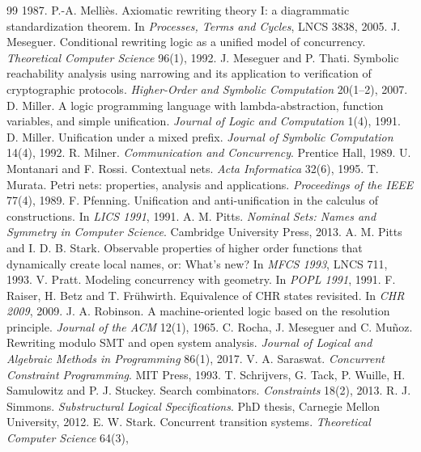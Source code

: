 \documentclass[11pt]{article}
\theoremstyle{remark}
\begin{document}
\begin{thebibliography}{99}
  1987.
 P.-A. Melli\`es. Axiomatic rewriting theory I: a diagrammatic standardization theorem.
  In \emph{Processes, Terms and Cycles}, LNCS 3838, 2005.
 J. Meseguer. Conditional rewriting logic as a unified model of concurrency.
  \emph{Theoretical Computer Science} 96(1), 1992.
 J. Meseguer and P. Thati. Symbolic reachability analysis using narrowing and its
  application to verification of cryptographic protocols. \emph{Higher-Order and Symbolic Computation}
  20(1--2), 2007.
 D. Miller. A logic programming language with lambda-abstraction, function variables, and
  simple unification. \emph{Journal of Logic and Computation} 1(4), 1991.
 D. Miller. Unification under a mixed prefix. \emph{Journal of Symbolic Computation}
  14(4), 1992.
 R. Milner. \emph{Communication and Concurrency}. Prentice Hall, 1989.
 U. Montanari and F. Rossi. Contextual nets. \emph{Acta Informatica} 32(6), 1995.
 T. Murata. Petri nets: properties, analysis and applications. \emph{Proceedings of the
  IEEE} 77(4), 1989.
 F. Pfenning. Unification and anti-unification in the calculus of constructions. In
  \emph{LICS 1991}, 1991.
 A. M. Pitts. \emph{Nominal Sets: Names and Symmetry in Computer Science}. Cambridge
  University Press, 2013.
 A. M. Pitts and I. D. B. Stark. Observable properties of higher order functions that
  dynamically create local names, or: What's new? In \emph{MFCS 1993}, LNCS 711, 1993.
 V. Pratt. Modeling concurrency with geometry. In \emph{POPL 1991}, 1991.
 F. Raiser, H. Betz and T. Fr\"uhwirth. Equivalence of CHR states revisited. In
  \emph{CHR 2009}, 2009.
 J. A. Robinson. A machine-oriented logic based on the resolution principle.
  \emph{Journal of the ACM} 12(1), 1965.
 C. Rocha, J. Meseguer and C. Mu\~noz. Rewriting modulo SMT and open system
  analysis. \emph{Journal of Logical and Algebraic Methods in Programming} 86(1), 2017.
 V. A. Saraswat. \emph{Concurrent Constraint Programming}. MIT Press, 1993.
 T. Schrijvers, G. Tack, P. Wuille, H. Samulowitz and P. J. Stuckey. Search
  combinators. \emph{Constraints} 18(2), 2013.
 R. J. Simmons. \emph{Substructural Logical Specifications}. PhD thesis, Carnegie Mellon
  University, 2012.
 E. W. Stark. Concurrent transition systems. \emph{Theoretical Computer Science} 64(3),

\end{thebibliography}
\end{document}
